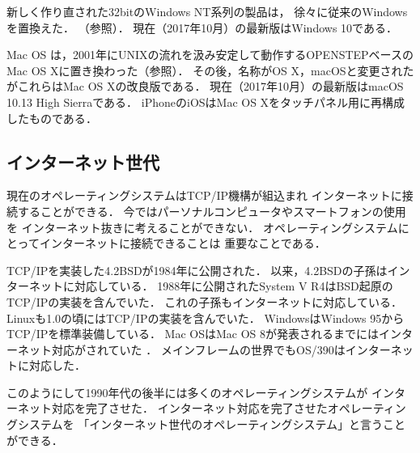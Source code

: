 \begin{enumerate}
\begin{itemize}
      新しく作り直された32bitのWindows NT系列の製品は，
      徐々に従来のWindowsを置換えた．
      （参照）．
      現在（2017年10月）の最新版はWindows 10である．

      Mac OS は，2001年にUNIXの流れを汲み安定して動作するOPENSTEPベースの
      Mac OS X\cite{macos}に置き換わった（参照）．
      その後，名称がOS X，macOSと変更されたがこれらはMac OS Xの改良版である．
      現在（2017年10月）の最新版はmacOS 10.13 High Sierraである．
      iPhoneのiOSはMac OS Xをタッチパネル用に再構成したものである\cite{ios}．
    \end{itemize}
\end{enumerate}

\subsection{インターネット世代}
現在のオペレーティングシステムはTCP/IP機構が組込まれ
インターネットに接続することができる．
今ではパーソナルコンピュータやスマートフォンの使用を
インターネット抜きに考えることができない．
オペレーティングシステムにとってインターネットに接続できることは
重要なことである．

TCP/IPを実装した4.2BSDが1984年に公開された\cite{bsd}．
以来，4.2BSDの子孫はインターネットに対応している．
1988年に公開されたSystem V R4はBSD起原のTCP/IPの実装を含んでいた\cite{svr4}．
これの子孫もインターネットに対応している．
Linuxも1.0の頃にはTCP/IPの実装を含んでいた\cite{linux1}．
WindowsはWindows 95からTCP/IPを標準装備している\cite{windows}．
Mac OSはMac OS 8が発表されるまでにはインターネット対応がされていた
\cite{classicmacos}．
メインフレームの世界でもOS/390はインターネットに対応した\cite{os390}．

このようにして1990年代の後半には多くのオペレーティングシステムが
インターネット対応を完了させた．
インターネット対応を完了させたオペレーティングシステムを
「インターネット世代のオペレーティングシステム」と言うことができる．

